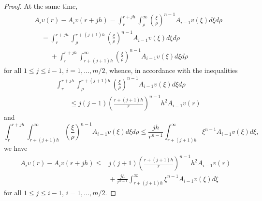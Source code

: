 \documentclass[10pt,a4paper]{amsart}
\begin{document}
\begin{proof}
At the same time,
\begin{align*}
	&
	A_i v (r) - A_i v (r + j h)
	=
	\int_r^{r + j h}
	\int_\rho^\infty
	\left(
		\frac{\xi}{\rho}
	\right)^{n - 1}
	A_{i-1} v (\xi)
	d\xi
	d\rho
	\\
	&
	\quad
	{}
	=
	\int_r^{r + j h}
	\int_\rho^{r + (j + 1) h}
	\left(
		\frac{\xi}{\rho}
	\right)^{n - 1}
	A_{i-1} v (\xi)
	d\xi
	d\rho
	\\
	&
	\quad
	\phantom{{}={}}
	{}
	+
	\int_r^{r + j h}
	\int_{r + (j + 1) h}^\infty
	\left(
		\frac{\xi}{\rho}
	\right)^{n - 1}
	A_{i-1} v (\xi)
	d\xi
	d\rho
\end{align*}
for all $1 \le j \le i - 1$, $i = 1, \ldots, m / 2$,
whence, in accordance with the inequalities
\begin{align*}
	&
	\int_r^{r + j h}
	\int_\rho^{r + (j + 1) h}
	\left(
		\frac{\xi}{\rho}
	\right)^{n - 1}
	A_{i-1} v (\xi)
	d\xi
	d\rho
	\\
	&
	\qquad
	{}
	\le
	j (j + 1)
	\left(
		\frac{r + (j + 1) h}{r}
	\right)^{n - 1}
	h^2
	A_{i - 1} v (r)
\end{align*}
and
$$
	\int_r^{r + j h}
	\int_{r + (j + 1) h}^\infty
	\left(
		\frac{\xi}{\rho}
	\right)^{n - 1}
	A_{i-1} v (\xi)
	d\xi
	d\rho
	\le
	\frac{
		j h
	}{
		r^{n - 1}
	}
	\int_{r + (j + 1) h}^\infty
	\xi^{n - 1}
	A_{i-1} v (\xi)
	d\xi,
$$
we have
\begin{align}
	A_i v (r) - A_i v (r + j h)
	\le
	{}
	&
	j (j + 1)
	\left(
		\frac{r + (j + 1) h}{r}
	\right)^{n - 1}
	h^2
	A_{i - 1} v (r)
	\label{PT2.2.5}
	\\
	&
	{}
	+
	\frac{
		j h
	}{
		r^{n - 1}
	}
	\int_{r + (j + 1) h}^\infty
	\xi^{n - 1}
	A_{i-1} v (\xi)
	d\xi
	\nonumber
\end{align}
for all $1 \le j \le i - 1$, $	i = 1, \ldots, m / 2$.


\end{proof}
\end{document}
